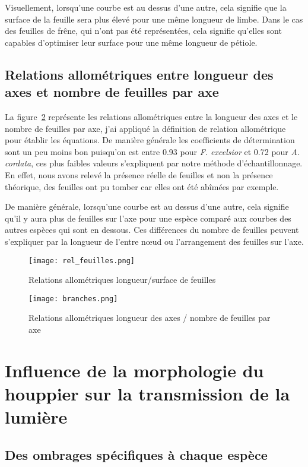 \documentclass[12pt]{report}
\begin{document}
Visuellement, lorsqu'une courbe est au dessus d'une autre, cela signifie que la
surface de la feuille sera plus élevé pour une même longueur de limbe. Dans le
cas des feuilles de frêne, qui n'ont pas été représentées, cela signifie
qu'elles sont capables d'optimiser leur surface pour une même longueur de
pétiole.

\subsection{Relations allométriques entre longueur des axes et nombre de
feuilles par axe}

La figure~\ref{fig:branches} représente les relations allométriques 
entre la longueur des axes et le nombre de feuilles par axe, j'ai appliqué la
définition de relation allométrique pour établir les
équations. De manière générale les coefficients de détermination sont un peu
moins bon puisqu'on est entre 0.93 pour \textit{F. excelsior} et 0.72 pour
\textit{A. cordata}, ces plus faibles valeurs s'expliquent par notre méthode
d'échantillonnage. En effet, nous avons relevé la présence réelle de feuilles et
non la présence théorique, des feuilles ont pu tomber car elles ont été abîmées
par exemple.

De manière générale, lorsqu'une courbe est au dessus d'une autre, cela signifie
qu'il y aura plus de feuilles sur l'axe pour une
espèce comparé aux courbes des autres espèces qui sont en dessous. Ces
différences du nombre de feuilles peuvent s'expliquer par la longueur de l'entre
n\oe{}ud ou l'arrangement des feuilles sur l'axe.

\begin{figure}
    \centering
    \texttt{[image: rel\_feuilles.png]}
    \caption{Relations allométriques longueur/surface de feuilles\label{fig:feuilles}}
\end{figure}
\begin{figure}
    \centering
    \texttt{[image: branches.png]}
    \caption{Relations allométriques longueur des axes / nombre de feuilles par axe\label{fig:branches}}
\end{figure}

\section{Influence de la morphologie du houppier sur la transmission de la lumière}

\subsection{Des ombrages spécifiques à chaque espèce}
\end{document}
